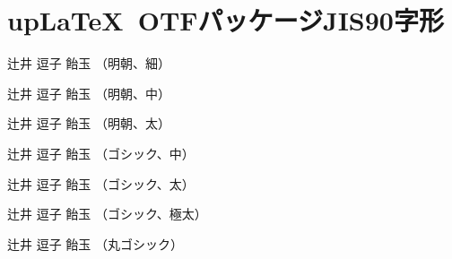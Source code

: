 \documentclass[uplatex]{jsarticle}
\begin{document}
\section{up\LaTeX~OTFパッケージJIS90字形}

\selectfont
辻井 逗子 飴玉 （明朝、細）

\selectfont
辻井 逗子 飴玉 （明朝、中）

\selectfont
辻井 逗子 飴玉 （明朝、太）

\selectfont
辻井 逗子 飴玉 （ゴシック、中）

\selectfont
辻井 逗子 飴玉 （ゴシック、太）

\selectfont
辻井 逗子 飴玉 （ゴシック、極太）

\selectfont
辻井 逗子 飴玉 （丸ゴシック）
\end{document}
